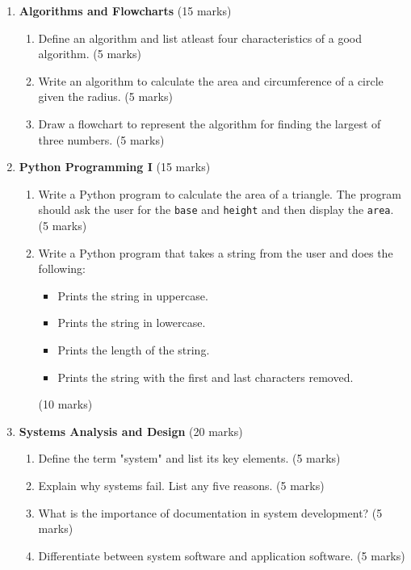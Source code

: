\documentclass[12pt]{article}
\begin{document}
\begin{enumerate}[left=0pt, label=\bfseries Q\arabic*.]
    \item \textbf{Algorithms and Flowcharts} \hfill (15 marks)\\
          \begin{enumerate}[label=(\alph*)]
              \item Define an algorithm and list atleast four characteristics of a good algorithm. \hfill (5 marks)
              \item Write an algorithm to calculate the area and circumference of a circle given the radius. \hfill (5 marks)
              \item Draw a flowchart to represent the algorithm for finding the largest of three numbers. \hfill (5 marks)
          \end{enumerate}

    \item \textbf{Python Programming I} \hfill (15 marks)\\
          \begin{enumerate}[label=(\alph*)]
              \item Write a Python program to calculate the area of a triangle. The program should ask the user for the \texttt{base} and \texttt{height} and then display the \texttt{area}. \hfill (5 marks)
              \item Write a Python program that takes a string from the user and does the following:
                    \begin{itemize}
                        \item Prints the string in uppercase.
                        \item Prints the string in lowercase.
                        \item Prints the length of the string.
                        \item Prints the string with the first and last characters removed.
                    \end{itemize}
                    \hfill (10 marks)
          \end{enumerate}

    \item \textbf{Systems Analysis and Design} \hfill (20 marks)\\
          \begin{enumerate}[label=(\alph*)]
              \item Define the term "system" and list its key elements. \hfill (5 marks)
              \item Explain why systems fail. List any five reasons. \hfill (5 marks)
              \item What is the importance of documentation in system development? \hfill (5 marks)
              \item Differentiate between system software and application software. \hfill (5 marks)
          \end{enumerate}
\end{enumerate}
\end{document}
